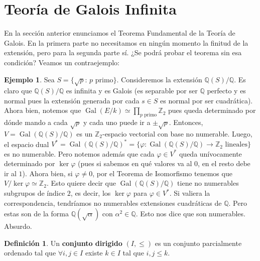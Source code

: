 \documentclass[12pt]{book}
\theoremstyle{definition}
\newtheorem{defn}[teo]{Definición}
\newtheorem{ex}[teo]{Ejemplo}
\newcommand{\ZZ}{\mathbb{Z}}      %
\newcommand{\QQ}{\mathbb{Q}}
\DeclareMathOperator{\Gal}{Gal}
\begin{document}
\section{Teoría de Galois Infinita}

En la sección anterior enunciamos el Teorema Fundamental de la Teoría de Galois. En la primera parte no necesitamos en ningún momento la finitud de la extensión, pero para la segunda parte sí. ¿Se podrá probar el teorema sin esa condición? Veamos un contraejemplo:

\begin{ex}
Sea $S=\{\sqrt{p} : \,p\text{ primo}\}$. Consideremos la extensión $\QQ(S)/\QQ$. Es claro que $\QQ(S)/\QQ$ es infinita y es Galois (es separable por ser $\QQ$ perfecto y es normal pues la extensión generada por cada $s\in S$ es normal por ser cuadrática). Ahora bien, notemos que $\Gal(E/k)\simeq \displaystyle\prod_{p\text{ primo}} \ZZ_2$ pues queda determinado por dónde mando a cada $\sqrt{p}$ y cada uno puede ir a $\pm\sqrt{p}$. Entonces, $V=\Gal(\QQ(S)/\QQ)$ es un $\ZZ_2$-espacio vectorial con base no numerable. Luego, el espacio dual $V^*=\Gal(\QQ(S)/\QQ)^*=\{\varphi:\Gal(\QQ(S)/\QQ)\to\ZZ_2 \text{ lineales}\}$ es no numerable. Pero notemos además que cada $\varphi\in V^*$ queda unívocamente determinado por $\ker\varphi$ (pues si sabemos en qué valores va al $0$, en el resto debe ir al $1$). Ahora bien, si $\varphi\neq 0$, por el Teorema de Isomorfismo tenemos que $V/\ker\varphi \simeq \ZZ_2$. Esto quiere decir que $\Gal(\QQ(S)/\QQ)$ tiene no numerables subgrupos de índice $2$, es decir, los $\ker\varphi$ para $\varphi\in V^*$. Si valiera la correspondencia, tendríamos no numerables extensiones cuadráticas de $\QQ$. Pero estas son de la forma $\QQ(\sqrt{\alpha})$ con $\alpha^2\in\QQ$. Esto nos dice que son numerables. Absurdo.
\end{ex}

\begin{defn}
Un \textbf{conjunto dirigido} $(I,\leq)$ es un conjunto parcialmente ordenado tal que $\forall i,j\in I$ existe $k\in I$ tal que $i,j\leq k$.
\end{defn}
\end{document}
